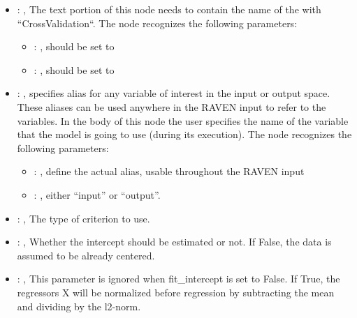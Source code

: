 \begin{itemize}
    \item {}: , 
      The text portion of this node needs to contain the name of the  with
               ``CrossValidation``.
      The  node recognizes the following parameters:
        \begin{itemize}
          \item {}: , 
            should be set to 
          \item {}: , 
            should be set to 
      \end{itemize}

    \item {}: , 
      specifies alias for         any variable of interest in the input or output space. These
      aliases can be used anywhere in the RAVEN input to         refer to the variables. In the body
      of this node the user specifies the name of the variable that the model is going to use
      (during its execution).
      The  node recognizes the following parameters:
        \begin{itemize}
          \item {}: , 
            define the actual alias, usable throughout the RAVEN input
          \item {}: , 
            either ``input'' or ``output''.
      \end{itemize}

    \item {}: , 
      The type of criterion to use.

    \item {}: , 
      Whether the intercept should be estimated or not. If False,
      the data is assumed to be already centered.

    \item {}: , 
      This parameter is ignored when fit\_intercept is set to False. If True,
      the regressors X will be normalized before regression by subtracting the mean and
      dividing by the l2-norm.


\end{itemize}
